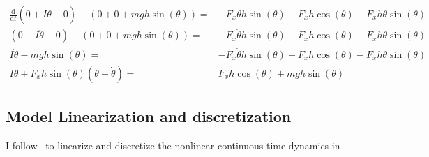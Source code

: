 \documentclass[12pt]{article}
\begin{document}
\begin{align}
\frac{\mathrm{d}}{\mathrm{d}t}
(0+I\dot{\theta}-0)
-(0+0+mgh\sin(\theta))=&-F_x\dot{\theta}h\sin(\theta)
+F_x h\cos(\theta)-F_x h\theta\sin(\theta)\\
(0+I\ddot{\theta}-0)
-(0+0+mgh\sin(\theta))=& -F_x\dot{\theta}h\sin(\theta)
+F_x h\cos(\theta)-F_x h\theta\sin(\theta) \\
I\ddot{\theta}-mgh\sin(\theta)=&-F_x\dot{\theta}h\sin(\theta)
+F_x h\cos(\theta)-F_x h\theta\sin(\theta) \\
I\ddot{\theta}
+F_x h\sin(\theta)(\theta+\dot{\theta})
=& F_x h\cos(\theta)+mgh\sin(\theta)
\end{align}


\subsection{Model Linearization and discretization}
I follow~\cite{zhakatayev_2017_successive_linearize_MPC}
to linearize and discretize the nonlinear continuous-time dynamics
in~\cite{???}


{}
\end{document}
